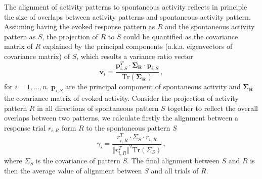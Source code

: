\documentclass[11pt]{article}
\begin{document}
	The alignment of activity patterns to spontaneous activity reflects in principle the size of overlaps between activity patterns and spontaneous activity pattern. 
	Assuming having the evoked response pattern as $R$ and the spontaneous activity pattern as $S$, the projection of $R$ to $S$ could be quantified as the covariance matrix of $R$ explained by the principal components (a.k.a. eigenvectors of covariance matrix) of $S$, which results a variance ratio vector
		\begin{equation} \label{eq:var_explain_spont_act_sym}
			\mathbf{v}_i = \frac{\mathbf{p}_{i, S}^T \cdot \mathbf{\Sigma_R} \cdot \mathbf{p}_{i, S}}{\text{Tr}(\mathbf{\Sigma_R})} \, , 
		\end{equation}
	for $i = 1, ..., n$. $\mathbf{p}_{i, S}$ are the principal component of spontaneous activity and $\mathbf{\Sigma_R}$ the covariance matrix of evoked activity. 
	Consider the projection of activity pattern $R$ in all directions of spontaneous pattern $S$ together to reflect the overall overlaps between two patterns, we calculate firstly the alignment between a response trial $r_{i, R}$ form $R$ to the spontaneous pattern $S$ 
		\begin{equation} \label{eq:align_to_spont_act_sym}
			\gamma_i = \frac{r^T_{i, R} \cdot \Sigma_S \cdot r_{i,R}}{\Vert r^T_{i, R} \Vert^2 \text{Tr}(\Sigma_S)}\, ,
		\end{equation}
	where $\Sigma_S$ is the covariance of pattern $S$. The final alignment between $S$ and $R$ is then the average value of alignment between $S$ and all trials of $R$. 
	
\end{document}
